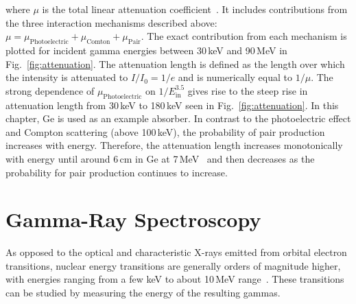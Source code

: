 where $\mu$ is the total linear attenuation coefficient~\cite{knoll}. It includes contributions from the three interaction mechanisms described above: $\mu = \mu_\text{Photoelectric} + \mu_\text{Comton} + \mu_\text{Pair}$. The exact contribution from each mechanism is plotted for incident gamma energies between 30\,keV and 90\,MeV in Fig.~\ref{fig:attenuation}. The attenuation length is defined as the length over which the intensity is attenuated to $I/I_0 = 1/e$ and is numerically equal to $1/\mu$. The strong dependence of $\mu_\text{Photoelectric}$ on $1/E_\text{in}^{3.5}$ gives rise to the steep rise in attenuation length from 30\,keV to 180\,keV seen in Fig.~\ref{fig:attenuation}. In this chapter, Ge is used as an example absorber. In contrast to the photoelectric effect and Compton scattering (above 100\,keV), the probability of pair production increases with energy. Therefore, the attenuation length increases monotonically with energy until around 6\,cm in Ge at 7\,MeV~\cite{NIST} and then decreases as the probability for pair production continues to increase. 

\section{Gamma-Ray Spectroscopy}
As opposed to the optical and characteristic X-rays emitted from orbital electron transitions, nuclear energy transitions are generally orders of magnitude higher, with energies ranging from a few keV to about 10\,MeV range~\cite{knoll}. These transitions can be studied by measuring the energy of the resulting gammas.

